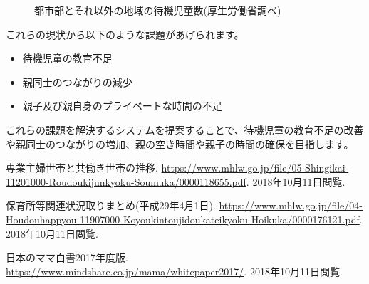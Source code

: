 \documentclass[a4j,titlepage]{jarticle}
\begin{document}
\begin{figure}[H]
\begin{center}
\caption{都市部とそれ以外の地域の待機児童数(厚生労働省調べ)}
\label{fig:3}
\end{center}
\end{figure}

これらの現状から以下のような課題があげられます。

\begin{itemize}
\item 待機児童の教育不足
\item 親同士のつながりの減少
\item 親子及び親自身のプライベートな時間の不足
\end{itemize}

これらの課題を解決するシステムを提案することで、待機児童の教育不足の改善や親同士のつながりの増加、親の空き時間や親子の時間の確保を目指します。

\begin{thebibliography}{3}
  専業主婦世帯と共働き世帯の推移.
  \newblock \url{https://www.mhlw.go.jp/file/05-Shingikai-11201000-Roudoukijunkyoku-Soumuka/0000118655.pdf}.
  \newblock 2018年10月11日閲覧.
  
  保育所等関連状況取りまとめ(平成29年4月1日).
  \newblock \url{https://www.mhlw.go.jp/file/04-Houdouhappyou-11907000-Koyoukintoujidoukateikyoku-Hoikuka/0000176121.pdf}.
  \newblock 2018年10月11日閲覧.

  日本のママ白書2017年度版.
  \newblock \url{https://www.mindshare.co.jp/mama/whitepaper2017/}.
  \newblock 2018年10月11日閲覧.  
\end{thebibliography}
\end{document}

